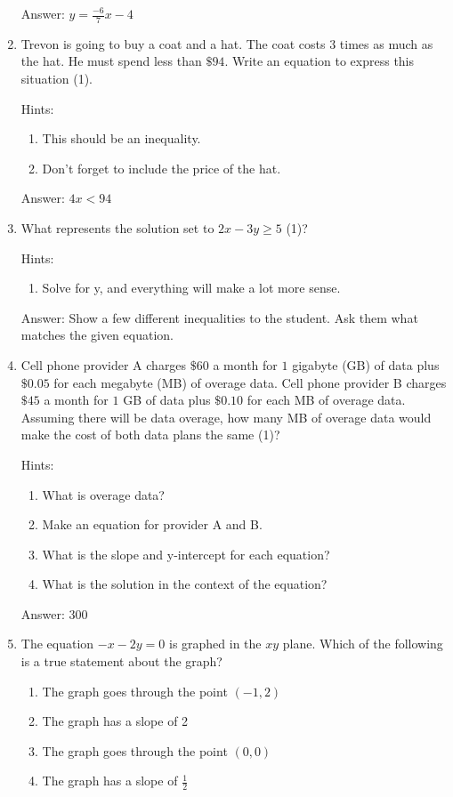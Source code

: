 \documentclass{article}
\begin{document}
\begin{enumerate}
{	      Answer: \(y=\frac{-6}{7}x-4\)}
	\item {Trevon is going to buy a coat and a hat. The coat costs $3$ times as much as the hat. He must spend less than $\$94$. Write an equation to express this situation (1).

	      Hints:
	      \begin{enumerate}
		      \item {This should be an inequality.}
		      \item {Don't forget to include the price of the hat.}
	      \end{enumerate}

	      Answer: \(4x < 94\)}
	\item {What represents the solution set to \(2x - 3y\geq5\) (1)?

	      Hints:
	      \begin{enumerate}
		      \item {Solve for y, and everything will make a lot more sense.}
	      \end{enumerate}

	      Answer: Show a few different inequalities to the student. Ask them what matches the given equation.}
	\item {Cell phone provider A charges $\$60$ a month for $1$ gigabyte (GB) of data plus $\$0.05$ for each megabyte (MB) of overage data. Cell phone provider B charges $\$45$ a month for $1$ GB of data plus $\$0.10$ for each MB of overage data. Assuming there will be data overage, how many MB of overage data would make the cost of both data plans the same (1)?

		      Hints:
		      \begin{enumerate}
			      \item {What is overage data?}
			      \item {Make an equation for provider A and B.}
			      \item {What is the slope and y-intercept for each equation?}
			      \item {What is the solution in the context of the equation?}
		      \end{enumerate}

		      Answer: $300$
	      }
	\item {The equation \(-x-2y=0\) is graphed in the $xy$ plane. Which of the following is a true statement about the graph?

	      \begin{enumerate}
		      \item {The graph goes through the point $(-1,2)$}
		      \item {The graph has a slope of 2}
		      \item {The graph goes through the point $(0,0)$}
		      \item {The graph has a slope of \(\frac{1}{2}\)}
	      \end{enumerate}

}
\end{enumerate}
\end{document}
